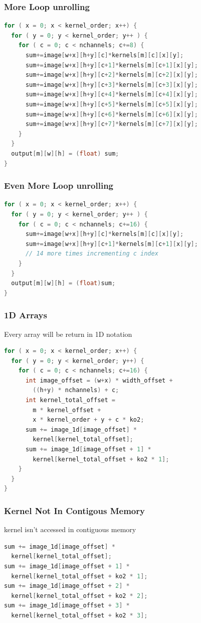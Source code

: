 \documentclass{beamer}
\begin{document}
\begin{frame}[fragile]
\frametitle{More Loop unrolling}
\begin{lstlisting}[language=C,keywordstyle=\color{blue}]
for ( x = 0; x < kernel_order; x++) {
  for ( y = 0; y < kernel_order; y++ ) {
    for ( c = 0; c < nchannels; c+=8) {
      sum+=image[w+x][h+y][c]*kernels[m][c][x][y];
      sum+=image[w+x][h+y][c+1]*kernels[m][c+1][x][y];
      sum+=image[w+x][h+y][c+2]*kernels[m][c+2][x][y];
      sum+=image[w+x][h+y][c+3]*kernels[m][c+3][x][y];
      sum+=image[w+x][h+y][c+4]*kernels[m][c+4][x][y];
      sum+=image[w+x][h+y][c+5]*kernels[m][c+5][x][y];
      sum+=image[w+x][h+y][c+6]*kernels[m][c+6][x][y];
      sum+=image[w+x][h+y][c+7]*kernels[m][c+7][x][y];
    }
  }
  output[m][w][h] = (float) sum;
}
\end{lstlisting}
\end{frame}

\begin{frame}[fragile]
\frametitle{Even More Loop unrolling}
\begin{lstlisting}[language=C,keywordstyle=\color{blue}]
for ( x = 0; x < kernel_order; x++) {
  for ( y = 0; y < kernel_order; y++ ) {
    for ( c = 0; c < nchannels; c+=16) {
      sum+=image[w+x][h+y][c]*kernels[m][c][x][y];
      sum+=image[w+x][h+y][c+1]*kernels[m][c+1][x][y];
      // 14 more times incrementing c index
    }
  }
  output[m][w][h] = (float)sum;
}
\end{lstlisting}
\end{frame}

\begin{frame}[fragile]
\frametitle{1D Arrays}
Every array will be return in 1D notation 
\begin{lstlisting}[language=C,keywordstyle=\color{blue}]
for ( x = 0; x < kernel_order; x++) {
  for ( y = 0; y < kernel_order; y++) {
    for ( c = 0; c < nchannels; c+=16) {
      int image_offset = (w+x) * width_offset + 
        ((h+y) * nchannels) + c;
      int kernel_total_offset = 
        m * kernel_offset + 
        x * kernel_order + y + c * ko2;
      sum += image_1d[image_offset] * 
        kernel[kernel_total_offset];
      sum += image_1d[image_offset + 1] * 
        kernel[kernel_total_offset + ko2 * 1];
    }
  }
}
\end{lstlisting}
\end{frame}

\begin{frame}[fragile]
\frametitle{Kernel Not In Contigous Memory}
kernel isn't accessed in contiguous memory
\begin{lstlisting}[language=C,keywordstyle=\color{blue}]
sum += image_1d[image_offset] * 
  kernel[kernel_total_offset];
sum += image_1d[image_offset + 1] * 
  kernel[kernel_total_offset + ko2 * 1];
sum += image_1d[image_offset + 2] * 
  kernel[kernel_total_offset + ko2 * 2];
sum += image_1d[image_offset + 3] * 
  kernel[kernel_total_offset + ko2 * 3];
\end{lstlisting}
\end{frame}
\end{document}
